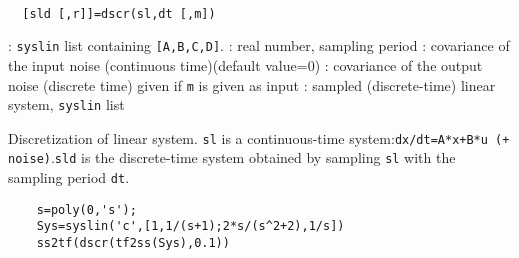\begin{mandesc}
   \\ %
\end{mandesc}
\begin{calling_sequence}
\begin{verbatim}
  [sld [,r]]=dscr(sl,dt [,m])  
\end{verbatim}
\end{calling_sequence}
\begin{parameters}
  \begin{varlist}
    : \verb!syslin! list containing \verb![A,B,C,D]!.
    : real number, sampling period
    : covariance of the input noise (continuous time)(default value=0)
    : covariance of the output noise (discrete time) given if \verb!m! is  given as input
    : sampled (discrete-time) linear system, \verb!syslin! list
  \end{varlist}
\end{parameters}
\begin{mandescription}
  Discretization of linear system. \verb!sl! is a continuous-time system:\verb!dx/dt=A*x+B*u (+ noise)!.\verb!sld! is the discrete-time system obtained by 
  sampling \verb!sl! with the sampling period \verb!dt!.
\end{mandescription}
\begin{examples}
  \begin{Verbatim}
    s=poly(0,'s');
    Sys=syslin('c',[1,1/(s+1);2*s/(s^2+2),1/s])
    ss2tf(dscr(tf2ss(Sys),0.1))
  \end{Verbatim}
\end{examples}
\begin{manseealso}
      
\end{manseealso}
